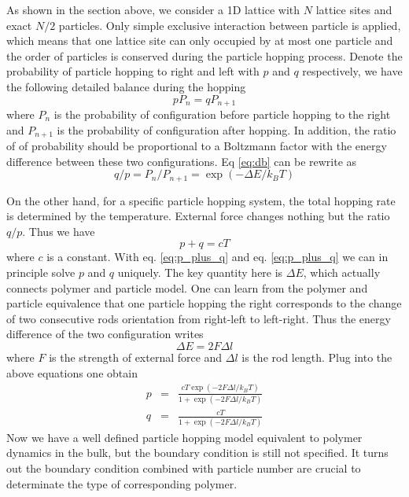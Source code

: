 \documentclass[aps,showpacs,twocolumn,floatfix,prx,superscriptaddress]{revtex4-1}
\begin{document}
As shown in the section above, we consider a 1D lattice with $N$ lattice sites and
exact $N/2$ particles. Only simple exclusive interaction between particle is
applied, which means that one lattice site can only occupied by at most one
particle and the order of particles is conserved during the particle hopping
process. Denote the probability of particle hopping to right and left with $p$
and $q$ respectively, we have the following detailed balance during the hopping
\begin{equation}
    p P_{n} = q P_{n+1} \label{eq:db}
\end{equation}
where $P_{n}$ is the probability of configuration before particle hopping to
the right and $P_{n+1}$ is the probability of configuration after hopping. 
In addition, the ratio of of probability should be proportional to a Boltzmann
factor with the energy difference between these two configurations. Eq
\ref{eq:db} can be rewrite as 
\begin{equation}
    q / p = P_{n} / P_{n+1} = \exp{(-\Delta E / k_B T)}  \label{eq:p_divide_q}
\end{equation}

On the other hand, for a specific particle hopping system, the total hopping
rate is determined by the temperature. External force changes nothing but the
ratio $q/p$. Thus we have
\begin{equation}
    p + q = cT \label{eq:p_plus_q}
\end{equation}
where $c$ is a constant. With eq. \ref{eq:p_plus_q} and eq. \ref{eq:p_plus_q}
we can in principle solve $p$ and $q$ uniquely. The key quantity here is
$\Delta E$, which actually connects polymer and particle model. One can learn
from the polymer and particle equivalence that one particle hopping the right
corresponds to the change of two consecutive rods orientation from right-left to
left-right. Thus the energy difference of the two configuration writes
\begin{equation}
    \Delta E = 2F\Delta l
\end{equation}
where $F$ is the strength of external force and $\Delta l $ is the rod length.
Plug into the above equations one obtain
\begin{eqnarray}
    \label{eq:p_and_q}
    p & =  & \frac{cT\exp{(-2F\Delta l / k_B T)}}{1+\exp{(-2F\Delta l / k_B
            T)}} \\
    q & =  & \frac{cT}{1+\exp{(-2F\Delta l / k_B T)}}
\end{eqnarray}
Now we have a well defined particle hopping model equivalent to polymer
dynamics in the bulk, but the boundary condition is still not specified. It
turns out the boundary condition combined with particle number are crucial to
determinate the type of corresponding polymer.
\end{document}
